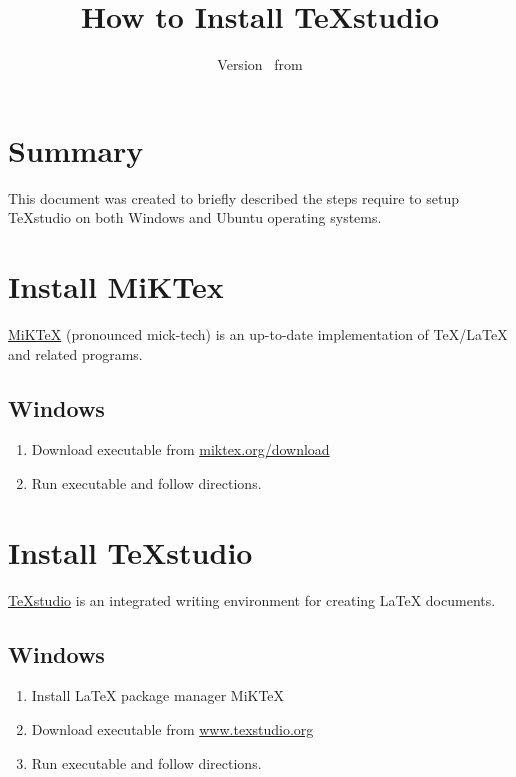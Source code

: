 \documentclass{scrartcl}
\newcommand{\docTitle}{How to Install TeXstudio}
\begin{document}
\title{\docTitle}
\author{\vhListAllAuthors}
\date{Version \vhCurrentVersion\ from \vhCurrentDate}
\maketitle

\section{Summary}
This document was created to briefly described the steps require to setup TeXstudio on both Windows and Ubuntu operating systems.


\section{Install MiKTex}
\label{sec:install_MiKTeX}

\href{https://miktex.org}{MiKTeX} (pronounced mick-tech) is an up-to-date implementation of TeX/LaTeX and related programs.

\subsection{Windows} 
\label{ssec:install_MiKTeX_windows}

\begin{enumerate}
	\item Download executable from \href{https://miktex.org/download}{miktex.org/download}
	\item Run executable and follow directions.
\end{enumerate}

\section{Install TeXstudio}
\label{sec:install_TeXstudio}

\href{https://www.texstudio.org/#home}{TeXstudio} is an integrated writing environment for creating LaTeX documents.

\subsection{Windows}
\label{ssec:install_TeXstudio_windows}

\begin{enumerate}
	\item Install LaTeX package manager MiKTeX
	\item Download executable from \href{https://www.texstudio.org/#download}{www.texstudio.org}
	\item Run executable and follow directions.
\end{enumerate}
\end{document}
